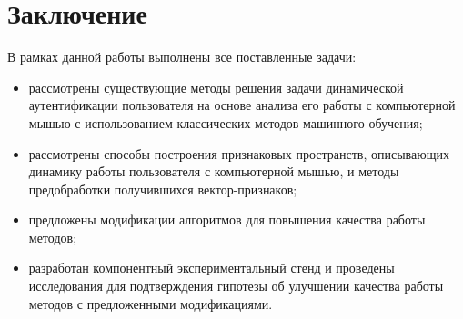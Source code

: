 \documentclass[12pt]{article}
\begin{document}
    \newpage



    \section{Заключение}
    \label{sec:Conclusion}

    \par В рамках данной работы выполнены все поставленные задачи:

    \begin{itemize}
        \item рассмотрены существующие методы решения задачи динамической аутентификации пользователя на основе анализа его работы с компьютерной мышью с использованием классических методов машинного обучения;
        \item рассмотрены способы построения признаковых пространств, описывающих динамику работы пользователя с компьютерной мышью, и методы предобработки получившихся вектор-признаков;
        \item предложены модификации алгоритмов для повышения качества работы методов;
        \item разработан компонентный экспериментальный стенд и проведены исследования для подтверждения гипотезы об улучшении качества работы методов с предложенными модификациями.
    \end{itemize}

    \newpage
\end{document}
